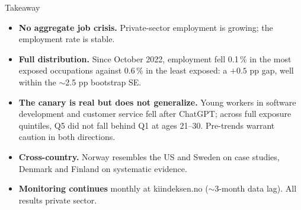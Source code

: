 
\begin{frame}{Takeaway}
\small
\begin{itemize}\setlength{\itemsep}{5pt}
  \item \textbf{No aggregate job crisis.} Private-sector employment is growing; the employment rate is stable.
  \item \textbf{Full distribution.} Since October 2022, employment fell 0.1\,\% in the most exposed occupations against 0.6\,\% in the least exposed: a $+0.5$ pp gap, well within the $\sim$2.5 pp bootstrap SE.
  \item \textbf{The canary is real but does not generalize.} Young workers in software development and customer service fell after ChatGPT; across full exposure quintiles, Q5 did not fall behind Q1 at ages 21--30. Pre-trends warrant caution in both directions.
  \item \textbf{Cross-country.} Norway resembles the US and Sweden on case studies, Denmark and Finland on systematic evidence.
  \item \textbf{Monitoring continues} monthly at kiindeksen.no ($\sim$3-month data lag). All results private sector.
\end{itemize}
\end{frame}
